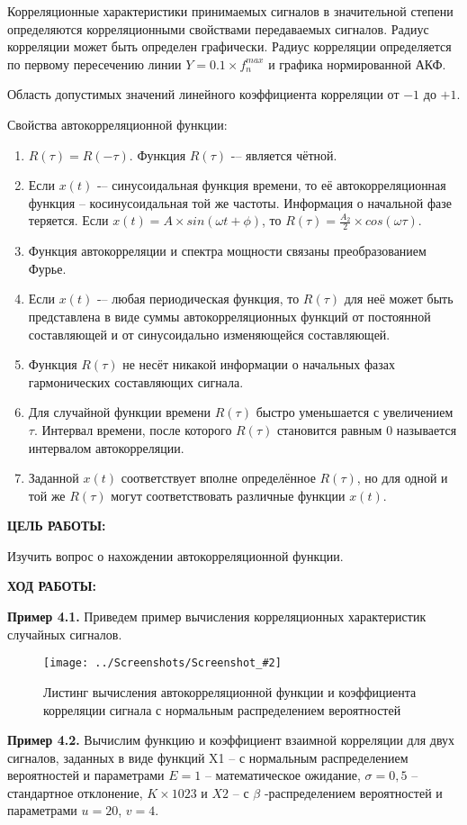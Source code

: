 \documentclass[14pt,a4paper]{extreport}
\newcommand{\sshot}[2]{\begin{figure}[ht]%
\centering\texttt{[image: ../Screenshots/Screenshot\_\#2]}%
\caption{#1}%
\label{sshot#2}%
\end{figure}%
}
\newcommand{\header}[1]{%
{
\clearpage%
\fontsize{16pt}{14pt}\selectfont
\begin{center}
\textbf{\MakeUppercase{#1}:}
\end{center}
}
}
\begin{document}
Корреляционные характеристики принимаемых сигналов в значительной степени определяются корреляционными свойствами передаваемых сигналов. 
Радиус корреляции может быть определен графически. Радиус корреляции определяется по первому пересечению линии $Y= 0.1 \times f_{n}^{max}$ и графика нормированной АКФ. 

Область допустимых значений линейного коэффициента корреляции от $-1$ до $+1$. 

Свойства автокорреляционной функции:
\begin{enumerate}
\item $R(\tau)=R(-\tau)$. Функция $R(\tau)$ -– является чётной.
\item Если $x(t)$ -– синусоидальная функция времени, то её автокорреляционная функция – косинусоидальная той же частоты. Информация о начальной фазе теряется. Если $x(t) = A \times sin(\omega t + \phi)$, то $R(\tau) = \frac{A_{2}}{2} \times cos(\omega\tau)$.
\item Функция автокорреляции и спектра мощности связаны преобразованием Фурье.
\item Если $x(t)$ -– любая периодическая функция, то $R(\tau)$ для неё может быть представлена в виде суммы автокорреляционных функций от постоянной составляющей и от синусоидально изменяющейся составляющей.
\item Функция $R(\tau)$ не несёт никакой информации о начальных фазах гармонических составляющих сигнала. 
\item Для случайной функции времени $R(\tau)$ быстро уменьшается с увеличением $\tau$. Интервал времени, после которого $R(\tau)$ становится равным 0 называется интервалом автокорреляции. 
\item Заданной $x(t)$ соответствует вполне определённое $R(\tau)$, но для одной и той же $R(\tau)$ могут соответствовать различные функции $x(t)$.
\end{enumerate}

\header{Цель работы}


Изучить вопрос о нахождении автокорреляционной функции.

\header{Ход работы}


\textbf{Пример 4.1. } Приведем пример вычисления корреляционных характеристик 
случайных сигналов.
 
\sshot{Листинг вычисления автокорреляционной функции и коэффициента корреляции сигнала с нормальным распределением вероятностей}{1}

\clearpage

\textbf{Пример 4.2. } Вычислим функцию и коэффициент взаимной корреляции для 
двух сигналов, заданных в виде функций X1 – с нормальным распределением 
вероятностей и параметрами $E = 1$ – математическое ожидание, $\sigma = 0,5$ – 
стандартное отклонение, $K \times 1023$ и $X2$ – с $\beta$ -распределением вероятностей и параметрами $u = 20$, $v = 4$.
 
\end{document}

